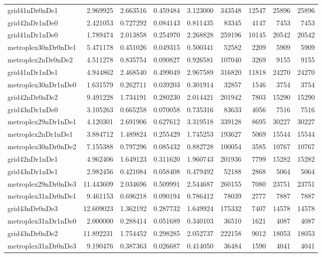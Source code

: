 \begin{longtable}{|l|r|r|r|r|r|r|r|r|}
grid41nDr0nDe1 & 2.969925 & 2.663516 & 0.459484 & 3.123000 & 343548 & 12547 & 25896 & 25896 \\
grid42nDr1nDe0 & 2.421053 & 0.727292 & 0.084143 & 0.811435 & 83345 & 4147 & 7453 & 7453 \\
grid41nDr1nDe0 & 1.789474 & 2.013858 & 0.254970 & 2.268828 & 259196 & 10145 & 20542 & 20542 \\
metroplex30nDr0nDe1 & 5.471178 & 0.451026 & 0.049315 & 0.500341 & 52582 & 2209 & 5909 & 5909 \\
metroplex2nDr0nDe2 & 4.511278 & 0.835754 & 0.090827 & 0.926581 & 107040 & 3269 & 9155 & 9155 \\
grid41nDr1nDe1 & 4.944862 & 2.468540 & 0.499049 & 2.967589 & 316820 & 11818 & 24270 & 24270 \\
metroplex30nDr1nDe0 & 1.631579 & 0.262711 & 0.039203 & 0.301914 & 32857 & 1546 & 3754 & 3754 \\
grid42nDr0nDe2 & 9.491228 & 1.734191 & 0.280230 & 2.014421 & 201942 & 7803 & 15290 & 15290 \\
grid43nDr1nDe0 & 3.105263 & 0.665258 & 0.070058 & 0.735316 & 83633 & 4056 & 7516 & 7516 \\
metroplex29nDr1nDe1 & 4.120301 & 2.691906 & 0.627612 & 3.319518 & 339128 & 8695 & 30227 & 30227 \\
metroplex2nDr1nDe1 & 3.884712 & 1.489824 & 0.255429 & 1.745253 & 193627 & 5069 & 15544 & 15544 \\
metroplex30nDr0nDe2 & 7.155388 & 0.797296 & 0.085432 & 0.882728 & 100054 & 3585 & 10767 & 10767 \\
grid42nDr1nDe1 & 4.962406 & 1.649123 & 0.311620 & 1.960743 & 201936 & 7799 & 15282 & 15282 \\
grid43nDr1nDe1 & 2.982456 & 0.421084 & 0.058408 & 0.479492 & 52188 & 2868 & 5064 & 5064 \\
metroplex29nDr0nDe3 & 11.443609 & 2.034696 & 0.509991 & 2.544687 & 260155 & 7080 & 23751 & 23751 \\
metroplex31nDr0nDe1 & 9.461153 & 0.696218 & 0.090194 & 0.786412 & 78039 & 2777 & 7887 & 7887 \\
grid43nDr0nDe3 & 12.609023 & 1.362192 & 0.287732 & 1.649924 & 175332 & 7407 & 14578 & 14578 \\
metroplex31nDr1nDe0 & 2.000000 & 0.288414 & 0.051689 & 0.340103 & 36510 & 1621 & 4087 & 4087 \\
grid43nDr0nDe2 & 11.892231 & 1.754452 & 0.298285 & 2.052737 & 222158 & 9012 & 18053 & 18053 \\
metroplex31nDr0nDe3 & 9.190476 & 0.387363 & 0.026687 & 0.414050 & 36484 & 1590 & 4041 & 4041 \\

\end{longtable}
